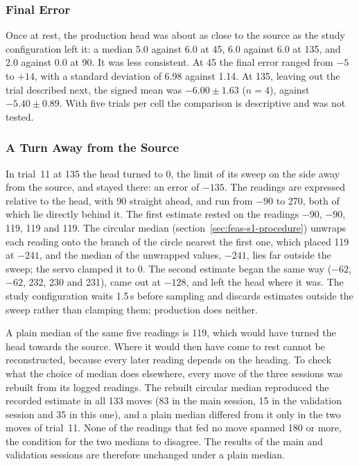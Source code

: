 \subsubsection{Final Error}

Once at rest, the production head was about as close to the source as the study
configuration left it: a median 5.0\textdegree{} against 6.0\textdegree{} at
45\textdegree{}, 6.0\textdegree{} against 6.0\textdegree{} at 135\textdegree{},
and 2.0\textdegree{} against 0.0\textdegree{} at 90\textdegree{}. It was less
consistent. At 45\textdegree{} the final error ranged from $-5$\textdegree{} to
$+14$\textdegree{}, with a standard deviation of 6.98\textdegree{} against
1.14\textdegree{}. At 135\textdegree{}, leaving out the trial described next, the
signed mean was $-6.00 \pm 1.63$\textdegree{} ($n = 4$), against
$-5.40 \pm 0.89$\textdegree{}. With five trials per cell the comparison is
descriptive and was not tested.

\subsubsection{A Turn Away from the Source}

In trial~11 at 135\textdegree{} the head turned to 0\textdegree{}, the limit of
its sweep on the side away from the source, and stayed there: an error of
$-135$\textdegree{}. The readings are expressed relative to the head, with
90\textdegree{} straight ahead, and run from $-90$\textdegree{} to
270\textdegree{}, both of which lie directly behind it. The first estimate
rested on the readings $-90$, $-90$, 119, 119 and 119\textdegree{}. The circular
median (section~\ref{sec:feas-s1-procedure}) unwraps each reading onto the branch
of the circle nearest the first one, which placed 119\textdegree{} at
$-241$\textdegree{}, and the median of the unwrapped values, $-241$\textdegree{},
lies far outside the sweep; the servo clamped it to 0\textdegree{}. The second
estimate began the same way ($-62$, $-62$, 232, 230 and 231\textdegree{}), came
out at $-128$\textdegree{}, and left the head where it was. The study
configuration waits 1.5\,s before sampling and discards estimates outside the
sweep rather than clamping them; production does neither.

A plain median of the same five readings is 119\textdegree{}, which would have
turned the head towards the source. Where it would then have come to rest cannot
be reconstructed, because every later reading depends on the heading. To check
what the choice of median does elsewhere, every move of the three sessions was
rebuilt from its logged readings. The rebuilt circular median reproduced the
recorded estimate in all 133 moves (83 in the main session, 15 in the validation
session and 35 in this one), and a plain median differed from it only in the two
moves of trial~11. None of the readings that fed no move spanned 180\textdegree{}
or more, the condition for the two medians to disagree. The results of the main
and validation sessions are therefore unchanged under a plain median.

